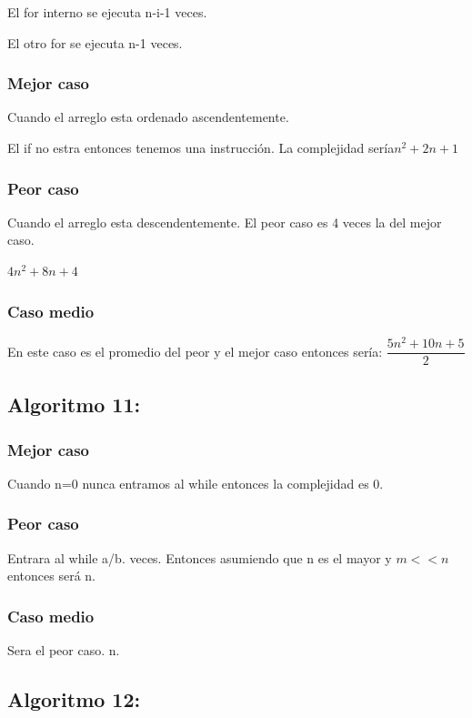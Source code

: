 \documentclass[12pt, fleqn]{article}                             %
\theoremstyle{break}                                            %
\begin{document}
    El for interno se ejecuta n-i-1 veces.

    El otro for se ejecuta n-1 veces.
    \subsubsection{Mejor caso}
    Cuando el arreglo esta ordenado ascendentemente.

    El if  no estra entonces tenemos una instrucción.
    La complejidad sería$ n^{2}+2n+1$

    \subsubsection{Peor caso}
    Cuando el arreglo esta descendentemente.
    El peor caso es 4 veces la del mejor caso.

    $4n^{2} +8n+4$

    \subsubsection{Caso medio}
    En este caso es el promedio del peor y el mejor caso entonces sería:
    $\dfrac{5n^{2}+10n+5}{2}$

    \subsection{Algoritmo 11:}
    
    \subsubsection{Mejor caso}

    Cuando n=0 nunca entramos al while entonces la complejidad es 0.

    \subsubsection{Peor caso}
    Entrara al while a/b. veces.
    Entonces asumiendo que n es el mayor y $m<<n$ entonces será n.

    \subsubsection{Caso medio}
    Sera el peor caso. n.
    \subsection{Algoritmo 12:}
    
\end{document}
